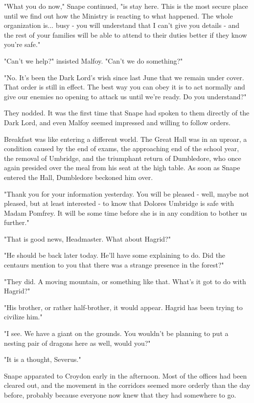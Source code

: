 "What you do now," Snape continued, "is stay here. This is the most secure place until we find out how the Ministry is reacting to what happened. The whole organization is... busy - you will understand that I can't give you details - and the rest of your families will be able to attend to their duties better if they know you're safe."

"Can't we help?" insisted Malfoy. "Can't we do something?"

"No. It's been the Dark Lord's wish since last June that we remain under cover. That order is still in effect. The best way you can obey it is to act normally and give our enemies no opening to attack us until we're ready. Do you understand?"

They nodded. It was the first time that Snape had spoken to them directly of the Dark Lord, and even Malfoy seemed impressed and willing to follow orders.

Breakfast was like entering a different world. The Great Hall was in an uproar, a condition caused by the end of exams, the approaching end of the school year, the removal of Umbridge, and the triumphant return of Dumbledore, who once again presided over the meal from his seat at the high table. As soon as Snape entered the Hall, Dumbledore beckoned him over.

"Thank you for your information yesterday. You will be pleased - well, maybe not pleased, but at least interested - to know that Dolores Umbridge is safe with Madam Pomfrey. It will be some time before she is in any condition to bother us further."

"That is good news, Headmaster. What about Hagrid?"

"He should be back later today. He'll have some explaining to do. Did the centaurs mention to you that there was a strange presence in the forest?"

"They did. A moving mountain, or something like that. What's it got to do with Hagrid?"

"His brother, or rather half-brother, it would appear. Hagrid has been trying to civilize him."

"I see. We have a giant on the grounds. You wouldn't be planning to put a nesting pair of dragons here as well, would you?"

"It is a thought, Severus."

Snape apparated to Croydon early in the afternoon. Most of the offices had been cleared out, and the movement in the corridors seemed more orderly than the day before, probably because everyone now knew that they had somewhere to go.

